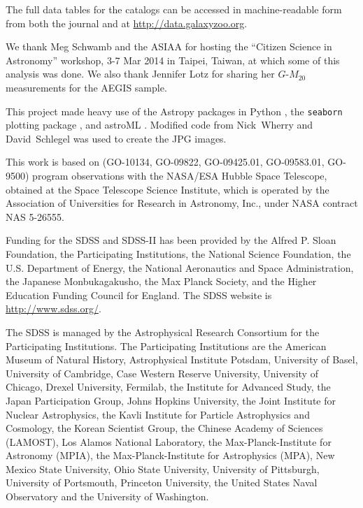 \documentclass[twocolumn]{aastex6}
\begin{document}
The full data tables for the catalogs can be accessed in machine-readable form from both the journal and at \url{http://data.galaxyzoo.org}.
 
\acknowledgments

We thank Meg Schwamb and the ASIAA for hosting the ``Citizen Science in Astronomy'' workshop, 3-7 Mar 2014 in Taipei, Taiwan, at which some of this analysis was done. We also thank Jennifer Lotz for sharing her $G$-$M_{20}$ measurements for the AEGIS sample.

This project made heavy use of the Astropy packages in Python \citep{ast13}, the \texttt{seaborn} plotting package \citep{was15}, and astroML \citep{van12}. Modified code from Nick~Wherry and David~Schlegel was used to create the JPG images. 

This work is based on (GO-10134, GO-09822, GO-09425.01, GO-09583.01, GO-9500) program observations with the NASA/ESA Hubble Space Telescope, obtained at the Space Telescope Science Institute, which is operated by the Association of Universities for Research in Astronomy, Inc., under NASA contract NAS 5-26555. 

Funding for the SDSS and SDSS-II has been provided by the Alfred P. Sloan Foundation, the Participating Institutions, the National Science Foundation, the U.S. Department of Energy, the National Aeronautics and Space Administration, the Japanese Monbukagakusho, the Max Planck Society, and the Higher Education Funding Council for England. The SDSS website is \url{http://www.sdss.org/}. 

The SDSS is managed by the Astrophysical Research Consortium for the Participating Institutions. The Participating Institutions are the American Museum of Natural History, Astrophysical Institute Potsdam, University of Basel, University of Cambridge, Case Western Reserve University, University of Chicago, Drexel University, Fermilab, the Institute for Advanced Study, the Japan Participation Group, Johns Hopkins University, the Joint Institute for Nuclear Astrophysics, the Kavli Institute for Particle Astrophysics and Cosmology, the Korean Scientist Group, the Chinese Academy of Sciences (LAMOST), Los Alamos National Laboratory, the Max-Planck-Institute for Astronomy (MPIA), the Max-Planck-Institute for Astrophysics (MPA), New Mexico State University, Ohio State University, University of Pittsburgh, University of Portsmouth, Princeton University, the United States Naval Observatory and the University of Washington. 


\end{document}
